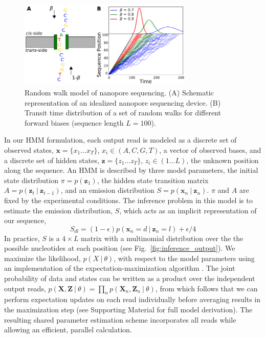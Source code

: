 \documentclass{biophys_letter}
\newcommand{\err}{\epsilon}
\begin{document}
\begin{figure}
  \centering
  \includegraphics[width=3.25in]{fig/stochseq-fig1.eps}
  \caption{Random walk model of nanopore sequencing. (A) Schematic representation of an idealized nanopore sequencing device. (B) Transit time distribution of a set of random walks for different forward biases (sequence length $L=100$).}
  \label{fig:fig1}
\end{figure}

In our HMM formulation, each output read is modeled as a discrete set of observed states, $\mathbf{x}=\{x_{1}\dots x_{T}\}$, $x_i \in (A,C,G,T)$, a vector of observed bases, and a discrete set of hidden states, $\mathbf{z}=\{z_{1} \dots z_{T}\}$, $z_i \in (1 \dots L)$, the unknown position along the sequence.
An HMM is described by three model parameters, the initial state distribution $\pi=p(\mathbf{z}_{1})$, the hidden state transition matrix $A=p(\mathbf{z}_{t}\:|\:\mathbf{z}_{t-1})$, and an emission distribution $S=p(\mathbf{x}_{n}\:|\:\mathbf{z}_{n})$. 
$\pi$ and $A$ are fixed by the experimental conditions. 
The inference problem in this model is to estimate the emission distribution, $S$, which acts as an implicit representation of our sequence,
\begin{equation}
  S_{dl} = (1-\err)p(\mathbf{x}_n = d\:|\:\mathbf{z}_{n} = l) + \err/4 
\end{equation}
In practice, $S$ is a $4 \times L$ matrix with a multinomial distribution over the the possible nucleotides at each position (see Fig.~\ref{fig:inference_output}).
We maximize the likelihood, $p(X \:|\: \theta)$, with respect to the model parameters using an implementation of the expectation-maximization algorithm \cite{Baum:1970}.
The joint probability of data and states can be written as a product over the independent output reads, $p(\mathbf{X},\mathbf{Z}\:|\:\theta)=\prod_{n}p(\mathbf{X}_n,\mathbf{Z}_n\:|\:\theta)$, from which follows that we can perform expectation updates on each read individually before averaging results in the maximization step (see Supporting Material for full model derivation).
The resulting shared parameter estimation scheme incorporates all reads while allowing an efficient, parallel calculation.
\end{document}
